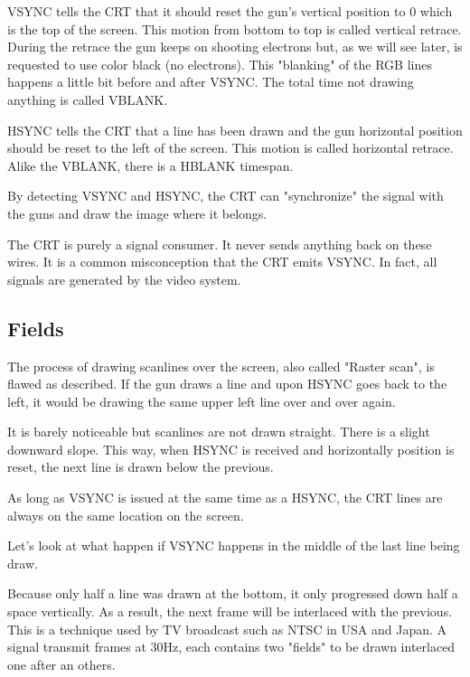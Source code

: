 VSYNC tells the CRT that it should reset the gun's vertical position to 0 which is the top of the screen. This motion from bottom to top is called vertical retrace. During the retrace the gun keeps on shooting electrons but, as we will see later, is requested to use color black (no electrons). This "blanking" of the RGB lines happens a little bit before and after VSYNC. The total time not drawing anything is called VBLANK.

HSYNC tells the CRT that a line has been drawn and the gun horizontal position should be reset to the left of the screen. This motion is called horizontal retrace. Alike the VBLANK, there is a HBLANK timespan.

By detecting VSYNC and HSYNC, the CRT can "synchronize" the signal with the guns and draw the image where it belongs.


\begin{trivia} The CRT is purely a signal consumer. It never sends anything back on these wires. It is a common misconception that the CRT emits VSYNC. In fact, all signals are generated by the video system.
\end{trivia}


\subsection{Fields}

The process of drawing scanlines over the screen, also called "Raster scan", is flawed as described. If the gun draws a line and upon HSYNC goes back to the left, it would be drawing the same upper left line over and over again. 

It is barely noticeable but scanlines are not drawn straight. There is a slight downward slope. This way, when HSYNC is received and horizontally position is reset, the next line is drawn below the previous.




As long as VSYNC is issued at the same time as a HSYNC, the CRT lines are always on the same location on the screen.

Let's look at what happen if VSYNC happens in the middle of the last line being draw.


Because only half a line was drawn at the bottom, it only progressed down half a space vertically. As a result, the next frame will be interlaced with the previous. This is a technique used by TV broadcast such as NTSC in USA and Japan. A signal transmit frames at 30Hz, each contains two "fields" to be drawn interlaced one after an others.

